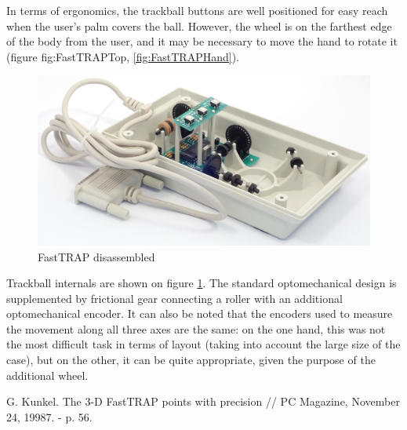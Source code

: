 \documentclass[11pt, a4paper]{article}
\begin{document}
In terms of ergonomics, the trackball buttons are well positioned for easy reach when the user's palm covers the ball. However, the wheel is on the farthest edge of the body from the user, and it may be necessary to move the hand to rotate it (figure {fig:FastTRAPTop}, \ref{fig:FastTRAPHand}).


\begin{figure}[h]
    \centering
    \includegraphics[scale=0.5]{1987_microspeed_fasttrap/inside_15.jpg}
    \caption{FastTRAP disassembled}
    \label{fig:FastTRAPInside}
\end{figure}

Trackball internals are shown on figure \ref{fig:FastTRAPInside}. The standard optomechanical design is supplemented by frictional gear connecting a roller with an additional optomechanical encoder. It can also be noted that the encoders used to measure the movement along all three axes are the same: on the one hand, this was not the most difficult task in terms of layout (taking into account the large size of the case), but on the other, it can be quite appropriate, given the purpose of the additional wheel.

\begin{thebibliography}{9}
 G. Kunkel. The 3-D FastTRAP points with precision // PC Magazine, November 24, 19987. - p. 56.
\end{thebibliography}
\end{document}
